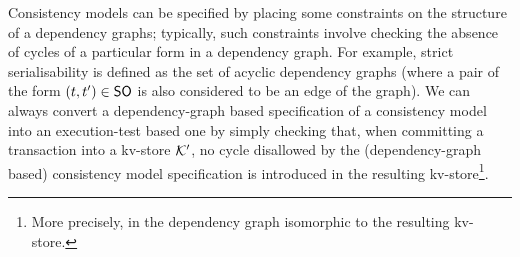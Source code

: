 Consistency models can be specified by placing some constraints on the structure of a dependency 
graphs; typically, such constraints involve checking the absence of cycles of a particular form 
in a dependency graph. For example, strict serialisability is defined as the set of acyclic dependency graphs 
(where a pair of the form $(t, t') \in \mathsf{SO}$ is also considered to be an edge of the graph). 
We can always convert a dependency-graph based specification of 
a consistency model into an execution-test based one by simply checking that, when committing  
a transaction into a kv-store $\mathcal{K}'$, no cycle disallowed by the (dependency-graph based) consistency model specification 
is introduced in the resulting kv-store\footnote{More precisely, in the dependency graph isomorphic to the resulting kv-store.}.



